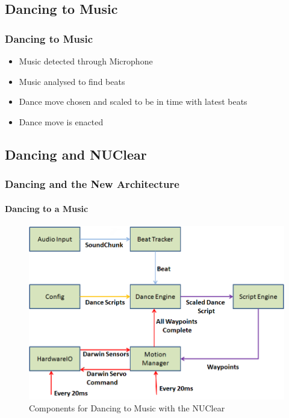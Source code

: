 \documentclass{beamer}
\begin{document}
	\subsection{Dancing to Music} %
	\begin{frame}
		\frametitle{Dancing to Music}
		\begin{itemize}
			\item Music detected through Microphone
			\item Music analysed to find beats
			\item Dance move chosen and scaled to be in time with latest beats
			\item Dance move is enacted
		\end{itemize}
	\end{frame}	
	\subsection{Dancing and NUClear} %
	\begin{frame}
		\frametitle{Dancing and the New Architecture}
		\framesubtitle{Dancing to a Music}
		\begin{figure}
			\centering
			\includegraphics[scale=.45]{Presentation_Resources/dance_audio_new_arc.png}
			\caption{Components for Dancing to Music with the NUClear}
		\end{figure}
	\end{frame}	
\end{document}
